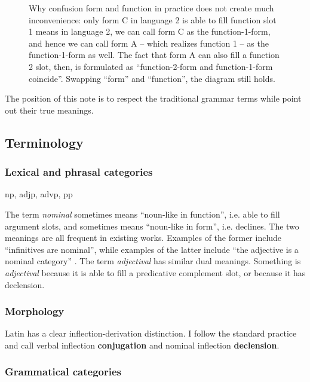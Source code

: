 \documentclass{article}
\newcommand*{\concept}[1]{\textbf{#1}}
\newcommand*{\term}[1]{\emph{#1}}
\begin{document}
\begin{figure}
    \centering
    
    \caption{Why confusion form and function in practice does not create much inconvenience:
    only form C in language 2 is able to fill function slot 1 means in language 2,
    we can call form C as the function-1-form,
    and hence we can call form A -- which realizes function 1 -- as the function-1-form as well.
    The fact that form A can also fill a function 2 slot, then,
    is formulated as ``function-2-form and function-1-form coincide''.
    Swapping ``form'' and ``function'', the diagram still holds.}
    \label{fig:form-function}
\end{figure}

The position of this note is to respect the traditional grammar terms
while point out their true meanings.

\subsection{Terminology}

\subsubsection{Lexical and phrasal categories}

\acl{np}, \ac{adjp}, \ac{advp}, \ac{pp}

The term \term{nominal} sometimes means ``noun-like in function'',
i.e. able to fill argument slots,
and sometimes means ``noun-like in form'',
i.e. declines.
The two meanings are all frequent in existing works.
Examples of the former include ``infinitives are nominal'',
while examples of the latter include ``the adjective is a nominal category'' \citep{de1991gerund}.
The term \term{adjectival} has similar dual meanings.
Something is \term{adjectival} because it is able to fill a predicative complement slot,
or because it has declension.

\subsubsection{Morphology}

Latin has a clear inflection-derivation distinction.
I follow the standard practice and call verbal inflection \concept{conjugation} 
and nominal inflection \concept{declension}.

\subsubsection{Grammatical categories}
\end{document}
